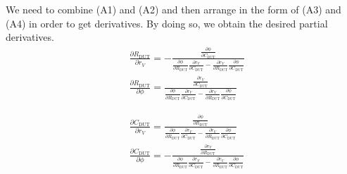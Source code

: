 \documentclass[%
 aip,
 amsmath,amssymb,
 reprint,%
]{revtex4-1}
\begin{document}
\noindent We need to combine (A1) and (A2) and then arrange in the form of (A3) and (A4) in order to get derivatives. By doing so, we obtain the desired partial derivatives.
\begin{align}
&\frac{\partial R_{\textrm{DUT}}}{\partial r_{V}}=-\frac{\frac{\partial \phi}{\partial C_{\textrm{DUT}}}}{\frac{\partial \phi}{\partial R_{\textrm{DUT}}}\frac{\partial r_{V}}{\partial C_{\textrm{DUT}}} - \frac{\partial r_{V}}{\partial R_{\textrm{DUT}}}\frac{\partial \phi}{\partial C_{\textrm{DUT}}}}\\
&\frac{\partial R_{\textrm{DUT}}}{\partial \phi}=\frac{\frac{\partial r_{V}}{\partial C_{\textrm{DUT}}}}{\frac{\partial \phi}{\partial R_{\textrm{DUT}}}\frac{\partial r_{V}}{\partial C_{\textrm{DUT}}} - \frac{\partial r_{V}}{\partial R_{\textrm{DUT}}}\frac{\partial \phi}{\partial C_{\textrm{DUT}}}}
\end{align}

\begin{align}
&\frac{\partial C_{\textrm{DUT}}}{\partial r_{V}}=\frac{\frac{\partial \phi}{\partial R_{\textrm{DUT}}}}{\frac{\partial \phi}{\partial R_{\textrm{DUT}}}\frac{\partial r_{V}}{\partial C_{\textrm{DUT}}} - \frac{\partial r_{V}}{\partial R_{\textrm{DUT}}}\frac{\partial \phi}{\partial C_{\textrm{DUT}}}}\\
&\frac{\partial C_{\textrm{DUT}}}{\partial \phi}=-\frac{\frac{\partial r_{V}}{\partial R_{\textrm{DUT}}}}{\frac{\partial \phi}{\partial R_{\textrm{DUT}}}\frac{\partial r_{V}}{\partial C_{\textrm{DUT}}} - \frac{\partial r_{V}}{\partial R_{\textrm{DUT}}}\frac{\partial \phi}{\partial C_{\textrm{DUT}}}}
\end{align}




\end{document}
